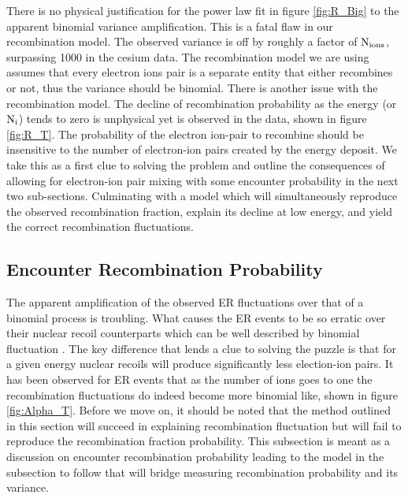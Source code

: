 There is no physical justification for the power law fit in figure \ref{fig:R_Big} to the apparent binomial variance amplification. This is a fatal flaw in our recombination model. The observed variance is off by roughly a factor of $\rm N_{ions}$, surpassing 1000 in the cesium data. The recombination model we are using assumes that every electron ions pair is a separate entity that either recombines or not, thus the variance should be binomial. There is another issue with the recombination model. The decline of recombination probability as the energy (or $\rm N_i$) tends to zero is unphysical yet is observed in the data, shown in figure \ref{fig:R_T}. The probability of the electron ion-pair to recombine should be insensitive to the number of electron-ion pairs created by the energy deposit. We take this as a first clue to solving the problem and outline the consequences of allowing for electron-ion pair mixing with some encounter probability in the next two sub-sections. Culminating with a model which will simultaneously reproduce the observed recombination fraction, explain its decline at low energy, and yield the correct recombination fluctuations.

\newpage 

\subsection{Encounter Recombination Probability}

The apparent amplification of the observed ER fluctuations over that of a binomial process is troubling. What causes the ER events to be so erratic over their nuclear recoil counterparts which can be well described by binomial fluctuation \cite{Dahl_Thesis}. The key difference that lends a clue to solving the puzzle is that for a given energy nuclear recoils will produce significantly less election-ion pairs. It has been observed for ER events that as the number of ions goes to one the recombination fluctuations do indeed become more binomial like, shown in figure \ref{fig:Alpha_T}. Before we move on, it should be noted that the method outlined in this section will succeed in explaining recombination fluctuation but will fail to reproduce the recombination fraction probability. This subsection is meant as a discussion on encounter recombination probability leading to the model in the subsection to follow that will bridge measuring recombination probability and its variance.

